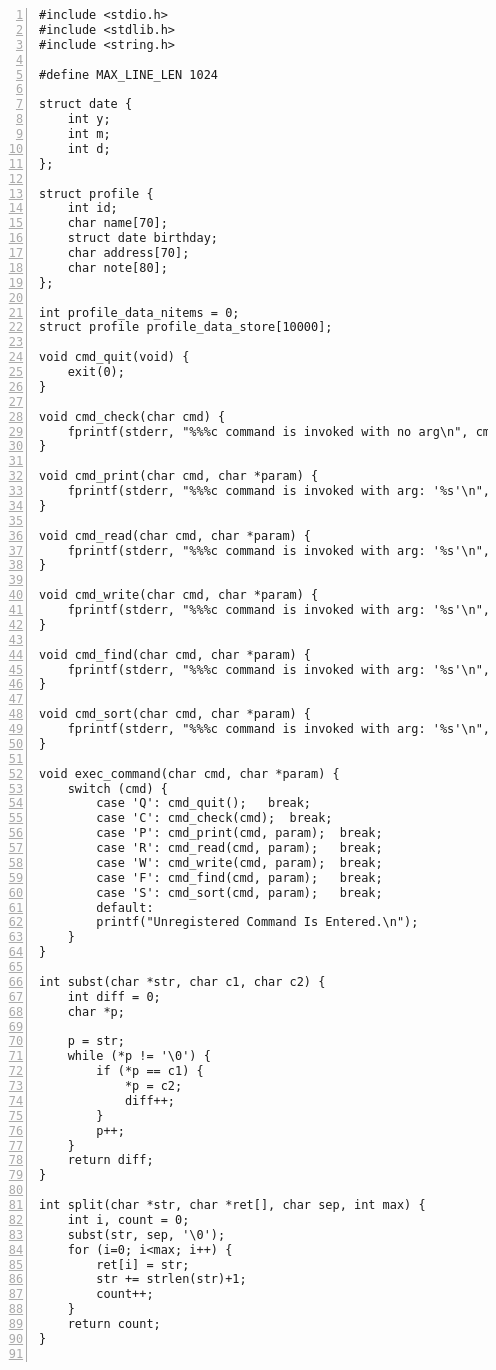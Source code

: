 \documentclass[autodetect-engine,dvi=dvipdfmx,ja=standard,
               a4j,11pt]{bxjsarticle}
\begin{document}
\begin{Verbatim}[numbers=left, xleftmargin=10mm, numbersep=6pt,
    fontsize=\small, baselinestretch=0.8]
#include <stdio.h>
#include <stdlib.h>
#include <string.h>

#define MAX_LINE_LEN 1024

struct date {
    int y;
    int m;
    int d;
};

struct profile {
    int id;
    char name[70];
    struct date birthday;
    char address[70];
    char note[80];
};

int profile_data_nitems = 0;
struct profile profile_data_store[10000];

void cmd_quit(void) {
    exit(0);
}

void cmd_check(char cmd) {
    fprintf(stderr, "%%%c command is invoked with no arg\n", cmd);
}

void cmd_print(char cmd, char *param) {
    fprintf(stderr, "%%%c command is invoked with arg: '%s'\n", cmd, param);
}

void cmd_read(char cmd, char *param) {
    fprintf(stderr, "%%%c command is invoked with arg: '%s'\n", cmd, param);
}

void cmd_write(char cmd, char *param) {
    fprintf(stderr, "%%%c command is invoked with arg: '%s'\n", cmd, param);
}

void cmd_find(char cmd, char *param) {
    fprintf(stderr, "%%%c command is invoked with arg: '%s'\n", cmd, param);
}

void cmd_sort(char cmd, char *param) {
    fprintf(stderr, "%%%c command is invoked with arg: '%s'\n", cmd, param);
}

void exec_command(char cmd, char *param) {
    switch (cmd) {
        case 'Q': cmd_quit();   break;
        case 'C': cmd_check(cmd);  break;
        case 'P': cmd_print(cmd, param);  break;
        case 'R': cmd_read(cmd, param);   break;
        case 'W': cmd_write(cmd, param);  break;
        case 'F': cmd_find(cmd, param);   break;
        case 'S': cmd_sort(cmd, param);   break;
        default:
        printf("Unregistered Command Is Entered.\n");
    }
}

int subst(char *str, char c1, char c2) {
    int diff = 0;
    char *p;

    p = str;
    while (*p != '\0') {
        if (*p == c1) {
            *p = c2;
            diff++;
        }
        p++;
    }
    return diff;
}

int split(char *str, char *ret[], char sep, int max) {
    int i, count = 0;
    subst(str, sep, '\0');
    for (i=0; i<max; i++) {
        ret[i] = str;
        str += strlen(str)+1;
        count++;
    }
    return count;
}


\end{Verbatim}
\end{document}
